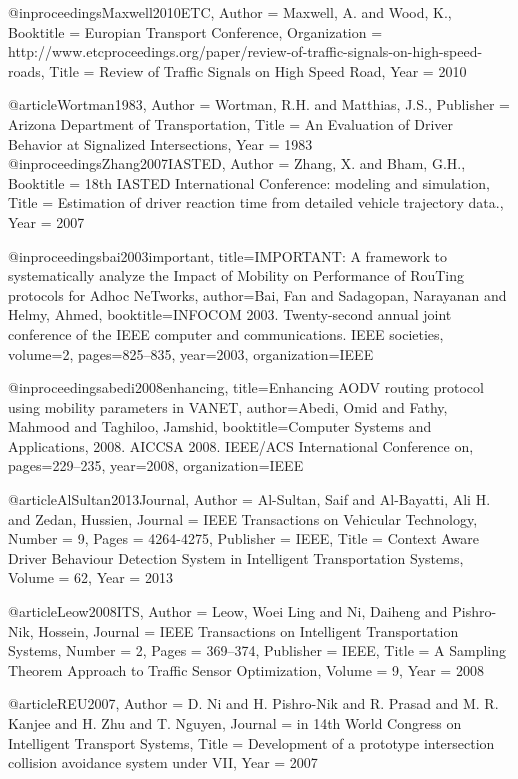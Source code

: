 {{{{{{@inproceedings{Maxwell2010ETC,
	Author = {Maxwell, A. and Wood, K.},
	Booktitle = {Europian Transport Conference},
	Organization = {http://www.etcproceedings.org/paper/review-of-traffic-signals-on-high-speed-roads},
	Title = {Review of Traffic Signals on High Speed Road},
	Year = {2010}}

@article{Wortman1983,
	Author = {Wortman, R.H. and Matthias, J.S.},
	Publisher = {Arizona Department of Transportation},
	Title = {An Evaluation of Driver Behavior at Signalized Intersections},
	Year = {1983}}
@inproceedings{Zhang2007IASTED,
	Author = {Zhang, X. and Bham, G.H.},
	Booktitle = {18th IASTED International Conference: modeling and simulation},
	Title = {Estimation of driver reaction time from detailed vehicle trajectory data.},
	Year = {2007}}


@inproceedings{bai2003important,
	title={IMPORTANT: A framework to systematically analyze the Impact of Mobility on Performance of RouTing protocols for Adhoc NeTworks},
	author={Bai, Fan and Sadagopan, Narayanan and Helmy, Ahmed},
	booktitle={INFOCOM 2003. Twenty-second annual joint conference of the IEEE computer and communications. IEEE societies},
	volume={2},
	pages={825--835},
	year={2003},
	organization={IEEE}
}


@inproceedings{abedi2008enhancing,
	title={Enhancing AODV routing protocol using mobility parameters in VANET},
	author={Abedi, Omid and Fathy, Mahmood and Taghiloo, Jamshid},
	booktitle={Computer Systems and Applications, 2008. AICCSA 2008. IEEE/ACS International Conference on},
	pages={229--235},
	year={2008},
	organization={IEEE}
}


@article{AlSultan2013Journal,
	Author = {Al-Sultan, Saif and Al-Bayatti, Ali H. and Zedan, Hussien},
	Journal = {IEEE Transactions on Vehicular Technology},
	Number = {9},
	Pages = {4264-4275},
	Publisher = {IEEE},
	Title = {Context Aware Driver Behaviour Detection System in Intelligent Transportation Systems},
	Volume = {62},
	Year = {2013}}






@article{Leow2008ITS,
	Author = {Leow, Woei Ling and Ni, Daiheng and Pishro-Nik, Hossein},
	Journal = {IEEE Transactions on Intelligent Transportation Systems},
	Number = {2},
	Pages = {369--374},
	Publisher = {IEEE},
	Title = {A Sampling Theorem Approach to Traffic Sensor Optimization},
	Volume = {9},
	Year = {2008}}



@article{REU2007,
	Author = {D. Ni and H. Pishro-Nik and R. Prasad and M. R. Kanjee and H. Zhu and T. Nguyen},
	Journal = {in 14th World Congress on Intelligent Transport Systems},
	Title = {Development of a prototype intersection collision avoidance system under VII},
	Year = {2007}}




}}}}}}

